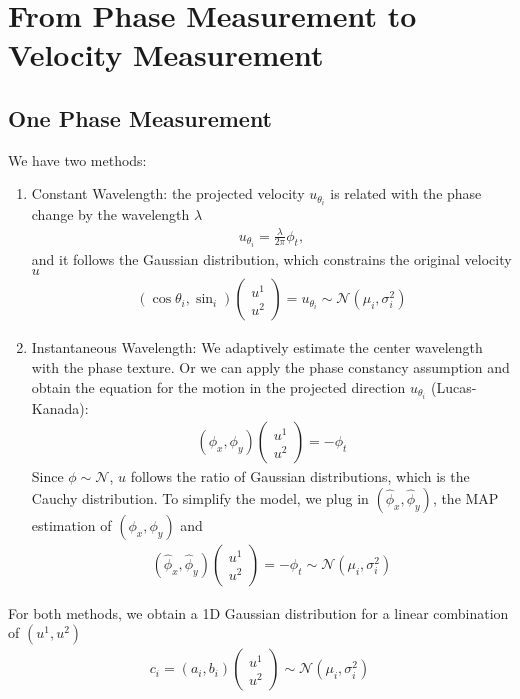 \documentclass{article}
\begin{document}
\section{From Phase Measurement to Velocity Measurement}
\subsection{One Phase Measurement}
We have two methods:
\begin{enumerate}
\item Constant Wavelength: the projected velocity $u_{\theta_i}$ is related with the phase change by the wavelength $\lambda$ 
\begin{align}
u_{\theta_i}=\frac{\lambda}{2\pi}\phi_t\nonumber,
\end{align}
and it follows the Gaussian distribution,
which constrains the original velocity $u$
\begin{align}
(\cos\theta_i,\sin_i)\left(\begin{array}{c}u^1\\u^2\end{array}\right) =u_{\theta_i}\sim\mathcal{N}(\mu_i,\sigma_i^2)
\end{align}
\item Instantaneous Wavelength:
We adaptively estimate the center wavelength with the phase texture.
Or we can apply the phase constancy assumption and obtain the equation for the motion in the projected direction $u_{\theta_i}$ (Lucas-Kanada):
\begin{align}
(\phi_x, \phi_y)\left(\begin{array}{c}u^1\\u^2\end{array}\right) = -\phi_t \nonumber
\end{align}
Since $\phi\sim\mathcal{N}$, $u$ follows the ratio of Gaussian distributions, which is the Cauchy distribution. 
To simplify the model, we plug in $(\hat\phi_x,\hat\phi_y)$, the MAP estimation of $(\phi_x,\phi_y)$ 
and 
\begin{align}
(\hat\phi_x, \hat\phi_y)\left(\begin{array}{c}u^1\\u^2\end{array}\right)
=-\phi_t\sim\mathcal{N}(\mu_i,\sigma_i^2)
\end{align}
\end{enumerate}
For both methods, we obtain a 1D Gaussian distribution for a linear combination of $(u^1,u^2)$
\begin{align}
c_i = (a_i,b_i)\left(\begin{array}{c}u^1\\u^2\end{array}\right)  \sim \mathcal{N}(\mu_i,\sigma_i^2)
\end{align}
\end{document}

